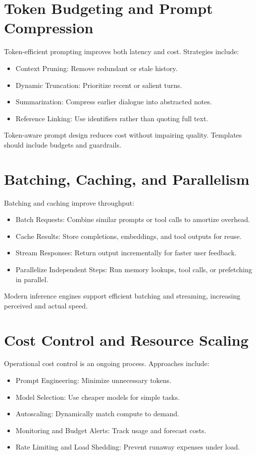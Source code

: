 \documentclass{book}
\begin{document}
\section{Token Budgeting and Prompt Compression}

Token-efficient prompting improves both latency and cost. Strategies include:

\begin{itemize}
  \item Context Pruning: Remove redundant or stale history.
  \item Dynamic Truncation: Prioritize recent or salient turns.
  \item Summarization: Compress earlier dialogue into abstracted notes.
  \item Reference Linking: Use identifiers rather than quoting full text.
\end{itemize}

Token-aware prompt design reduces cost without impairing quality. Templates should include budgets and guardrails.

\section{Batching, Caching, and Parallelism}

Batching and caching improve throughput:

\begin{itemize}
  \item Batch Requests: Combine similar prompts or tool calls to amortize overhead.
  \item Cache Results: Store completions, embeddings, and tool outputs for reuse.
  \item Stream Responses: Return output incrementally for faster user feedback.
  \item Parallelize Independent Steps: Run memory lookups, tool calls, or prefetching in parallel.
\end{itemize}

Modern inference engines support efficient batching and streaming, increasing perceived and actual speed.

\section{Cost Control and Resource Scaling}

Operational cost control is an ongoing process. Approaches include:

\begin{itemize}
  \item Prompt Engineering: Minimize unnecessary tokens.
  \item Model Selection: Use cheaper models for simple tasks.
  \item Autoscaling: Dynamically match compute to demand.
  \item Monitoring and Budget Alerts: Track usage and forecast costs.
  \item Rate Limiting and Load Shedding: Prevent runaway expenses under load.
\end{itemize}
\end{document}
